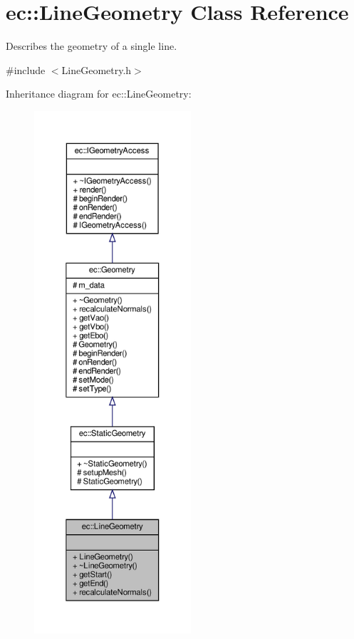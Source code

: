 \hypertarget{classec_1_1_line_geometry}{}\section{ec\+:\+:Line\+Geometry Class Reference}
\label{classec_1_1_line_geometry}


Describes the geometry of a single line.  




{\ttfamily \#include $<$Line\+Geometry.\+h$>$}



Inheritance diagram for ec\+:\+:Line\+Geometry\+:\nopagebreak
\begin{figure}[H]
\begin{center}
\leavevmode
\includegraphics[height=550pt]{classec_1_1_line_geometry__inherit__graph}
\end{center}
\end{figure}


